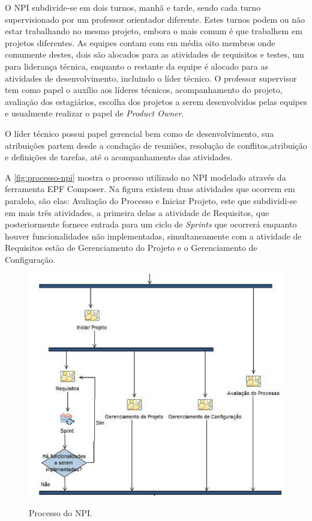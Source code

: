 O NPI subdivide-se em dois turnos, manhã e tarde, sendo cada turno supervisionado por um professor orientador diferente. Estes turnos podem ou não estar trabalhando no mesmo projeto, embora o mais comum é que trabalhem em projetos diferentes. As equipes contam com em média oito membros onde comumente destes, dois são alocados para as atividades de requisitos e testes, um para liderança técnica, enquanto o restante da equipe é alocado para as atividades de desenvolvimento, incluindo o líder técnico. O professor supervisor tem como papel o auxílio aos líderes técnicos, acompanhamento do projeto, avaliação dos estagiários, escolha dos projetos a serem desenvolvidos pelas equipes e usualmente realizar o papel de \textit{Product Owner}. 

O líder técnico possui papel gerencial bem como de desenvolvimento, sua atribuições partem desde a condução de reuniões, resolução de conflitos,atribuição e definições de tarefas, até o acompanhamento das atividades. 

A \autoref{fig:processo-npi} mostra o processo utilizado no NPI modelado através da ferramenta EPF Composer. Na figura	existem duas atividades que ocorrem em paralelo, são elas: Avaliação do Processo e Iniciar Projeto, este que subdividi-se em mais três atividades, a primeira delas a atividade de Requisitos, que posteriormente fornece entrada para um ciclo de \textit{Sprints} que ocorrerá enquanto houver funcionalidades não implementadas, simultaneamente com a atividade de Requisitos estão de Gerenciamento do Projeto e o Gerenciamento de Configuração.
\begin{figure}[H]
\centering
\caption[Processo do NPI]{Processo do NPI.}
\includegraphics[scale=0.8]{./images/processo-npi}
\label{fig:processo-npi}
\end{figure}


